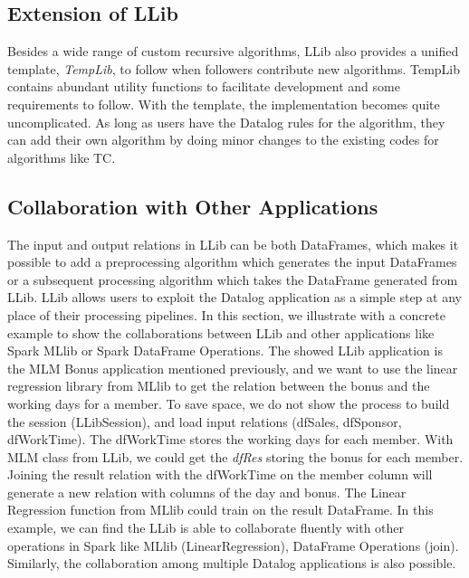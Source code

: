 \subsection{Extension of LLib}
Besides a wide range of custom recursive algorithms, LLib also provides a unified template, \textit{TempLib}, to follow when followers contribute  new algorithms. 
TempLib contains abundant utility functions to facilitate development and some requirements to follow. %
With the template, the implementation becomes quite uncomplicated. As long as users have the Datalog rules for the algorithm, they can add their own algorithm by doing minor changes to the existing codes for algorithms like TC. 


\subsection{Collaboration with Other Applications}
The input and output relations in LLib can be both DataFrames, which makes it possible to add a preprocessing algorithm which generates the input DataFrames  or  a subsequent processing algorithm which takes the DataFrame generated from LLib. LLib allows users to exploit the Datalog application as a simple step at any place of their  processing pipelines. In this section, we illustrate with a concrete example to show the collaborations between LLib and other applications like Spark MLlib or Spark DataFrame Operations. The showed LLib application is the MLM Bonus application mentioned previously, and we want to use the linear regression library from MLlib to get the relation between the bonus and the working days for a member. To save space, we do not show the process to build the session (LLibSession), and load input relations (dfSales, dfSponsor, dfWorkTime).  The dfWorkTime stores the working days for each member. With MLM class from LLib, we could get the \textit{dfRes} storing the bonus for each member. Joining the result relation with the dfWorkTime on the member column will generate a new relation with columns of the day and bonus. The Linear Regression function from MLlib could train on the result DataFrame. In this example, we can find the  LLib is able to collaborate fluently with other operations in Spark like MLlib (LinearRegression), DataFrame Operations (join). Similarly, the collaboration among multiple Datalog applications is also possible.  

